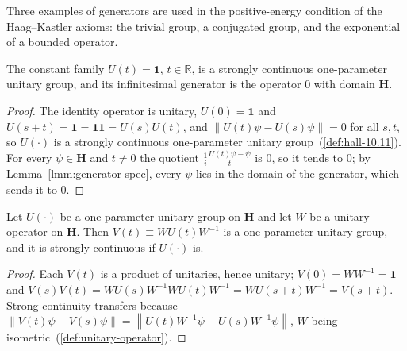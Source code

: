Three examples of generators are used in the positive-energy condition of the Haag–Kastler axioms: the trivial group, a conjugated group, and the exponential of a bounded operator.

\begin{lemma}
    \label{lmm:generator-const}
    \leanok
    The constant family $U(t) = \mathbf{1}$, $t \in \mathbb{R}$, is a strongly continuous one-parameter unitary group, and its infinitesimal generator is the operator $0$ with domain $\mathbf{H}$.
\end{lemma}
\begin{proof}
    \leanok
    The identity operator is unitary, $U(0) = \mathbf{1}$ and $U(s+t) = \mathbf{1} = \mathbf{1}\mathbf{1} = U(s)U(t)$, and $\left\| U(t)\psi - U(s)\psi \right\| = 0$ for all $s, t$, so $U(\cdot)$ is a strongly continuous one-parameter unitary group~(\ref{def:hall-10.11}). For every $\psi \in \mathbf{H}$ and $t \ne 0$ the quotient $\frac{1}{i}\frac{U(t)\psi - \psi}{t}$ is $0$, so it tends to $0$; by Lemma~\ref{lmm:generator-spec}, every $\psi$ lies in the domain of the generator, which sends it to $0$.
\end{proof}

\begin{lemma}
    \label{lmm:conj-unitary-group}
    \leanok
    Let $U(\cdot)$ be a one-parameter unitary group on $\mathbf{H}$ and let $W$ be a unitary operator on $\mathbf{H}$. Then $V(t) \equiv WU(t)W^{-1}$ is a one-parameter unitary group, and it is strongly continuous if $U(\cdot)$ is.
\end{lemma}
\begin{proof}
    \leanok
    Each $V(t)$ is a product of unitaries, hence unitary; $V(0) = WW^{-1} = \mathbf{1}$ and $V(s)V(t) = WU(s)W^{-1}WU(t)W^{-1} = WU(s+t)W^{-1} = V(s+t)$. Strong continuity transfers because $\left\| V(t)\psi - V(s)\psi \right\| = \left\| U(t)W^{-1}\psi - U(s)W^{-1}\psi \right\|$, $W$ being isometric~(\ref{def:unitary-operator}).
\end{proof}

